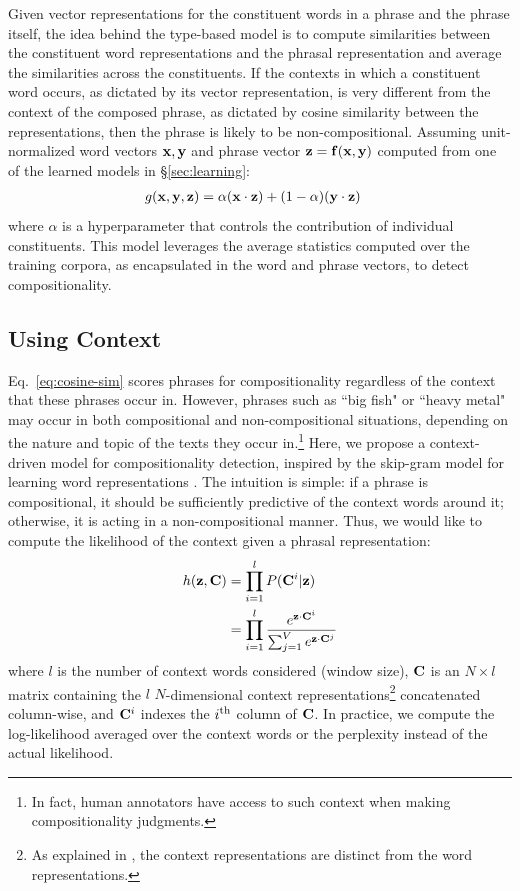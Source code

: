 \documentclass[11pt,letterpaper]{article}
\newcommand{\bX}{{\bf x}}
\newcommand{\bY}{{\bf y}}
\newcommand{\bZ}{{\bf z}}
\newcommand{\bF}{{\bf f}}
\newcommand{\bC}{{\bf C}}
\begin{document}
Given vector representations for the constituent words in a phrase and the phrase itself, the idea behind the type-based model is to compute similarities between the constituent word representations and the phrasal representation and average the similarities across the constituents. 
If the contexts in which a constituent word occurs, as dictated by its vector representation, is very different from the context of the composed phrase, as dictated by cosine similarity between the representations, then the phrase is likely to be non-compositional. 
Assuming unit-normalized word vectors $\bX, \bY$ and phrase vector $\bZ = \bF(\bX, \bY)$ computed from one of the learned models in \S\ref{sec:learning}:
\begin{align}
	g(\bX, \bY, \bZ) &= \alpha (\bX \cdot \bZ) + (1-\alpha)(\bY \cdot \bZ)
	\label{eq:cosine-sim}
\end{align}
where $\alpha$ is a hyperparameter that controls the contribution of individual constituents. 
This model leverages the average statistics computed over the training corpora, as encapsulated in the word and phrase vectors, to detect compositionality. 

\subsection{Using Context}
\label{sec:context}

Eq.~\ref{eq:cosine-sim} scores phrases for compositionality regardless of the context that these phrases occur in. 
However, phrases such as ``big fish" or ``heavy metal" may occur in both compositional and non-compositional situations, depending on the nature and topic of the texts they occur in.\footnote{In fact, human annotators have access to such context when making compositionality judgments.}
Here, we propose a context-driven model for compositionality detection, inspired by the skip-gram model for learning word representations \cite{Mikolov2013b}. 
The intuition is simple: if a phrase is compositional, it should be sufficiently predictive of the context words around it; otherwise, it is acting in a non-compositional manner. 
Thus, we would like to compute the likelihood of the context given a phrasal representation:
\begin{align}
	h(\bZ, \bC) &= \prod_{i=1}^l P(\bC^i | \bZ) \nonumber \\
	&= \prod_{i=1}^l \frac{e^{\bZ \cdot \bC^i}}{\sum_{j=1}^{V} e^{\bZ \cdot \bC^j}}
	\label{eq:likelihood}
\end{align}
where $l$ is the number of context words considered (window size), $\bC$ is an $N \times l$ matrix containing the $l$ $N$-dimensional context representations\footnote{As explained in , the context representations are distinct from the word representations.} concatenated column-wise, and $\bC^i$ indexes the $i\textsuperscript{th}$ column of $\bC$. 
In practice, we compute the log-likelihood averaged over the context words or the perplexity instead of the actual likelihood. 
\end{document}
